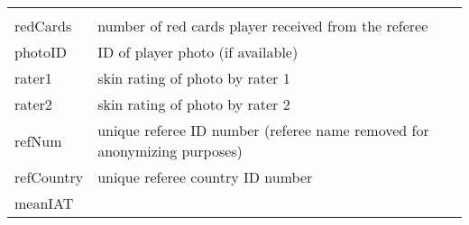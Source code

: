 \documentclass[11pt]{article}
\begin{document}
\begin{longtable}[]{@{}ll@{}}
\begin{minipage}[t]{0.04\columnwidth}
\end{minipage}\tabularnewline
\begin{minipage}[t]{0.04\columnwidth}\raggedright\strut
redCards\strut
\end{minipage} & \begin{minipage}[t]{0.04\columnwidth}\raggedright\strut
number of red cards player received from the referee\strut
\end{minipage}\tabularnewline
\begin{minipage}[t]{0.04\columnwidth}\raggedright\strut
photoID\strut
\end{minipage} & \begin{minipage}[t]{0.04\columnwidth}\raggedright\strut
ID of player photo (if available)\strut
\end{minipage}\tabularnewline
\begin{minipage}[t]{0.04\columnwidth}\raggedright\strut
rater1\strut
\end{minipage} & \begin{minipage}[t]{0.04\columnwidth}\raggedright\strut
skin rating of photo by rater 1\strut
\end{minipage}\tabularnewline
\begin{minipage}[t]{0.04\columnwidth}\raggedright\strut
rater2\strut
\end{minipage} & \begin{minipage}[t]{0.04\columnwidth}\raggedright\strut
skin rating of photo by rater 2\strut
\end{minipage}\tabularnewline
\begin{minipage}[t]{0.04\columnwidth}\raggedright\strut
refNum\strut
\end{minipage} & \begin{minipage}[t]{0.04\columnwidth}\raggedright\strut
unique referee ID number (referee name removed for anonymizing
purposes)\strut
\end{minipage}\tabularnewline
\begin{minipage}[t]{0.04\columnwidth}\raggedright\strut
refCountry\strut
\end{minipage} & \begin{minipage}[t]{0.04\columnwidth}\raggedright\strut
unique referee country ID number\strut
\end{minipage}\tabularnewline
\begin{minipage}[t]{0.04\columnwidth}\raggedright\strut
meanIAT\strut
\end{minipage} & \begin{minipage}[t]{0.04\columnwidth}\raggedright\strut

\end{minipage}
\end{longtable}
\end{document}
